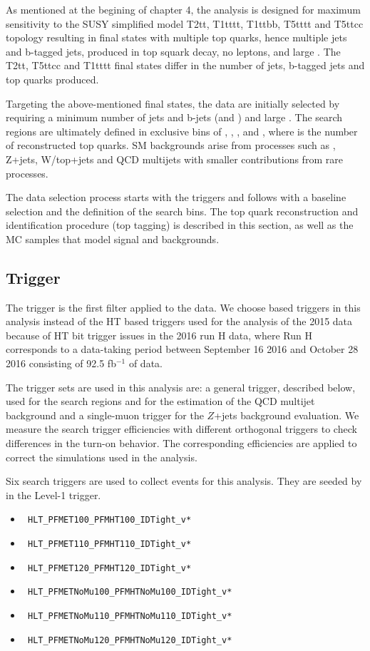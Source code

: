 As mentioned at the begining of chapter 4, the analysis is designed for maximum sensitivity to the SUSY simplified model T2tt, T1tttt, T1ttbb, T5tttt and T5ttcc topology resulting in final states with multiple top quarks, hence multiple jets and b-tagged jets, produced in top squark decay, no leptons, and large \MET. The T2tt, T5ttcc and T1tttt final states differ in the number of jets, b-tagged jets and top quarks produced. 

Targeting the above-mentioned final states, the data are initially selected by requiring a minimum number of jets and b-jets (\njets and \nbjets) and large \MET. The search regions are ultimately defined in exclusive bins of \ntops, \nbjets, \HT, \MET and \MTTwo, where \ntops is the number of reconstructed top quarks. SM backgrounds arise from processes such as \ttbar, Z+jets, W/top+jets and QCD multijets with smaller contributions from rare processes.

The data selection process starts with the triggers and follows with a baseline selection and the definition of the search bins. The top quark reconstruction and identification procedure (top tagging) is described in this section, as well as the MC samples that model signal and backgrounds.

\subsection{Trigger}
\label{sec:trig}

The trigger is the first filter applied to the data. We choose \MET based triggers in this analysis instead of the HT based triggers used for the analysis of the 2015 data because of HT bit trigger issues in the 2016 run H data, where Run H corresponds to a data-taking period between September 16 2016 and October 28 2016 consisting of 92.5 fb$^{-1}$ of data. 

The trigger sets are used in this analysis are: a general trigger, described below, used for the search regions and for the estimation of the QCD multijet background and a single-muon trigger for the $Z$+jets background evaluation. We measure the search trigger efficiencies with different orthogonal triggers to check differences in the turn-on behavior. The corresponding efficiencies are applied to correct the simulations used in the analysis.

Six search triggers are used to collect events for this analysis. They are seeded by \MET in the Level-1 trigger. 
\begin{itemize}
\item \texttt{ HLT\_PFMET100\_PFMHT100\_IDTight\_v*}
\item \texttt{ HLT\_PFMET110\_PFMHT110\_IDTight\_v*}
\item \texttt{ HLT\_PFMET120\_PFMHT120\_IDTight\_v*}
\item \texttt{ HLT\_PFMETNoMu100\_PFMHTNoMu100\_IDTight\_v*} 
\item \texttt{ HLT\_PFMETNoMu110\_PFMHTNoMu110\_IDTight\_v* }
\item \texttt{ HLT\_PFMETNoMu120\_PFMHTNoMu120\_IDTight\_v*}
\end{itemize}

